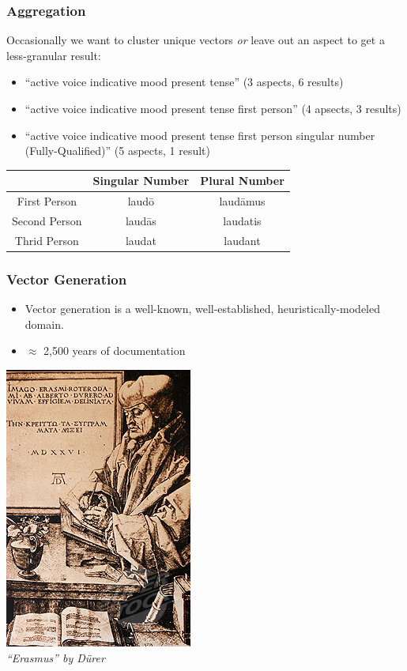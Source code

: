\documentclass[slidestop,compress,mathserif]{beamer}
\begin{document}
\begin{frame}
	\frametitle{Aggregation}
	Occasionally we want to cluster unique vectors \emph{or} leave out an aspect to get a less-granular result:
	\pause
	\begin{itemize}
		\item ``active voice indicative mood present tense'' (3 aspects, 6 results)
		\pause
		\item ``active voice indicative mood present tense first person'' (4 apsects, 3 results)
		\pause
		\item ``active voice indicative mood present tense first person singular number (Fully-Qualified)'' (5 aspects, 1 result)
	\end{itemize}
	\begin{center}
		\begin{tabular}{|c|c|c|}
			\hline
			  & Singular Number &  Plural Number\\
			\hline
			First Person  & laud\={o}  & laud\={a}mus\\
			Second Person & laud\={a}s & laudatis \\
			Thrid Person  & laudat     & laudant \\
			\hline
		\end{tabular}
	\end{center}
\end{frame}

\begin{frame}
	\frametitle{Vector Generation}
	\begin{itemize}
		\item Vector generation is a well-known, well-established, heuristically-modeled domain.
		\pause
		\item $\approx$ 2,500 years of documentation
	\end{itemize}
	\begin{center}
		\includegraphics[scale=0.5]{img/erasmus.jpg} \\
		\pause
		\emph{``Erasmus'' by D\"{u}rer}
	\end{center}

\end{frame}
\end{document}
